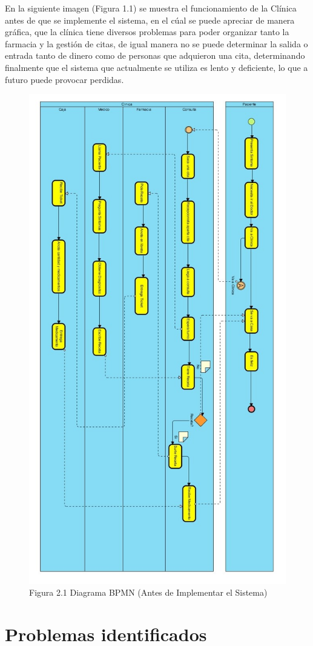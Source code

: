 En la siguiente imagen (Figura 1.1) se muestra el funcionamiento de la Cl\'inica antes de que se implemente el sistema, en el c\'ual se puede apreciar de manera gr\'afica, que la cl\'inica tiene diversos problemas para poder organizar tanto la farmacia y la gesti\'on de citas, de igual manera no se puede determinar la salida o entrada tanto de dinero como de personas que adquieron una cita, determinando finalmente que el sistema que actualmente se utiliza es lento y deficiente, lo que a futuro puede provocar perdidas.
\begin{figure}[htbp!]
\centering
		\includegraphics[width=.75\textwidth]{images/bpm1}
		\caption{Figura 2.1 Diagrama BPMN (Antes de Implementar el Sistema)}
	\end{figure}
\newpage
	
\section{Problemas identificados}

